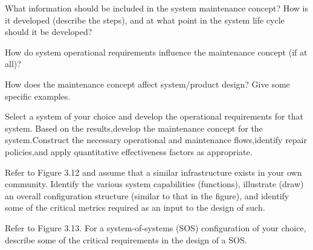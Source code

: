 \begin{exercises}
    \begin{exercise}
    \label{sea-03-07}
        What information should be included in the system maintenance concept? How is it developed (describe the steps), and at what point in the system life cycle should it be developed?
    \end{exercise}
    \begin{solution}
    \end{solution}
    
    \begin{exercise}
    \label{sea-03-08}
        How do system operational requirements influence the maintenance concept (if at all)?
    \end{exercise}
    \begin{solution}
    \end{solution}
    
    \begin{exercise}
    \label{sea-03-09}
        How does the maintenance concept affect system/product design? Give some specific examples.
    \end{exercise}
    \begin{solution}
    \end{solution}
    
    \begin{exercise}
    \label{sea-03-10}
        Select a system of your choice and develop the operational requirements for that system. Based on the results,develop the maintenance concept for the system.Construct the necessary operational and maintenance flows,identify repair policies,and apply quantitative effectiveness factors as appropriate.
    \end{exercise}
    \begin{solution}
    \end{solution}
    
    \begin{exercise}
    \label{sea-03-11}
        Refer to Figure 3.12 and assume that a similar infrastructure exists in your own community. Identify the various system capabilities (functions), illustrate (draw) an overall configuration structure (similar to that in the figure), and identify some of the critical metrics required as an input to the design of such.
    \end{exercise}
    \begin{solution}
    \end{solution}
    
    \begin{exercise}
    \label{sea-03-12}
        Refer to Figure 3.13. For a system-of-systems (SOS) configuration of your choice, describe some of the critical requirements in the design of a SOS. 
    \end{exercise}
    \begin{solution}
    \end{solution}
    

\end{exercises}

